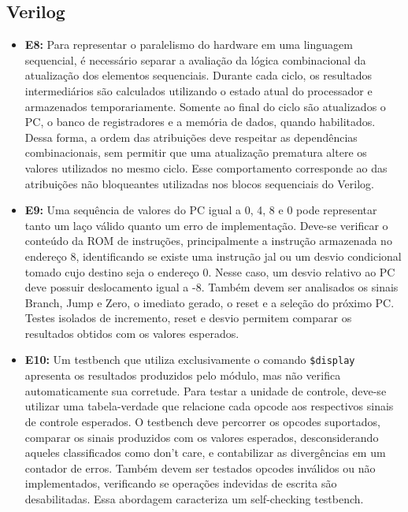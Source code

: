 \documentclass[12pt,a4paper,titlepage]{article}
\begin{document}
\subsection{Verilog}
\begin{itemize}
    \item\textbf{E8:}
        Para representar o paralelismo do hardware em uma linguagem sequencial, é necessário separar a avaliação da lógica
        combinacional da atualização dos elementos sequenciais. Durante cada ciclo, os resultados intermediários são calculados
        utilizando o estado atual do processador e armazenados temporariamente.
        Somente ao final do ciclo são atualizados o PC, o banco de registradores e a memória de dados, quando habilitados.
        Dessa forma, a ordem das atribuições deve respeitar as dependências combinacionais, sem permitir que uma atualização
        prematura altere os valores utilizados no mesmo ciclo. Esse comportamento corresponde ao das atribuições não bloqueantes
        utilizadas nos blocos sequenciais do Verilog.

    \item\textbf{E9:}
        Uma sequência de valores do PC igual a 0, 4, 8 e 0 pode representar tanto um laço válido quanto um erro de implementação.
        Deve-se verificar o conteúdo da ROM de instruções, principalmente a instrução armazenada no endereço 8, identificando
        se existe uma instrução jal ou um desvio condicional tomado cujo destino seja o endereço 0.
        Nesse caso, um desvio relativo ao PC deve possuir deslocamento igual a -8.
        Também devem ser analisados os sinais Branch, Jump e Zero, o imediato gerado, o reset e a seleção do próximo PC.
        Testes isolados de incremento, reset e desvio permitem comparar os resultados obtidos com os valores esperados.

    \item\textbf{E10:}
        Um testbench que utiliza exclusivamente o comando \texttt{\$display} apresenta os resultados produzidos pelo módulo,
        mas não verifica automaticamente sua corretude. Para testar a unidade de controle, deve-se utilizar uma tabela-verdade
        que relacione cada opcode aos respectivos sinais de controle esperados.
        O testbench deve percorrer os opcodes suportados, comparar os sinais produzidos com os valores esperados, desconsiderando
        aqueles classificados como don't care, e contabilizar as divergências em um contador de erros.
        Também devem ser testados opcodes inválidos ou não implementados, verificando se operações indevidas de escrita
        são desabilitadas. Essa abordagem caracteriza um self-checking testbench.
\end{itemize}
\end{document}
